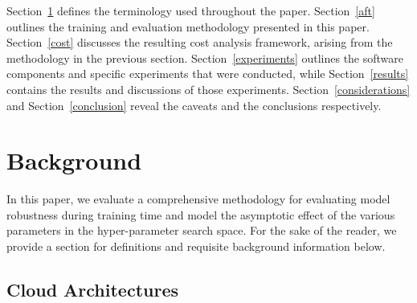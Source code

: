 \documentclass[sn-mathphys-num]{sn-jnl}%
\begin{document}
Section~\ref{background} defines the terminology used throughout the paper. Section~\ref{aft} outlines the training and evaluation methodology presented in this paper.  Section~\ref{cost} discusses the resulting cost analysis framework, arising from the methodology in the previous section. Section~\ref{experiments} outlines the software components and specific experiments that were conducted, while Section~\ref{results} contains the results and discussions of those experiments. Section~\ref{considerations} and Section~\ref{conclusion} reveal the caveats and the conclusions respectively.


\section{Background}
\label{background}



In this paper, we evaluate a comprehensive methodology for evaluating model robustness during training time and model the asymptotic effect of the various parameters in the hyper-parameter search space. For the sake of the reader, we provide a section for definitions and requisite background information below.


\subsection{Cloud Architectures}
\end{document}
